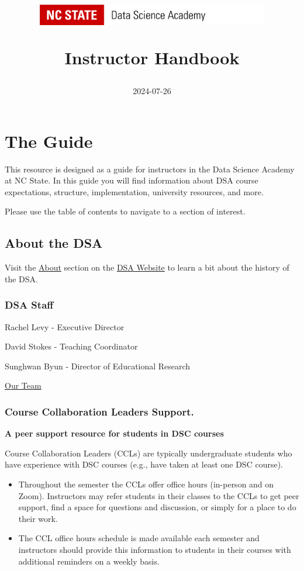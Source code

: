 \documentclass[
]{book}
\title{\includegraphics[width=4in,height=\textheight]{DSA Logo.png}

Instructor Handbook}
\author{2024-07-26}
\date{}
\providecommand{\tightlist}{%
  \setlength{\itemsep}{0pt}\setlength{\parskip}{0pt}}
\begin{document}
\maketitle

{
\setcounter{tocdepth}{1}
\tableofcontents
}
\chapter{The Guide}\label{the-guide}

This resource is designed as a guide for instructors in the Data Science Academy at NC State. In this guide you will find information about DSA course expectations, structure, implementation, university resources, and more.

Please use the table of contents to navigate to a section of interest.

\section{About the DSA}\label{about-the-dsa}

Visit the \href{https://datascienceacademy.ncsu.edu/about/}{About} section on the \href{https://datascienceacademy.ncsu.edu/}{DSA Website} to learn a bit about the history of the DSA.

\subsection{DSA Staff}\label{dsa-staff}

Rachel Levy - Executive Director

David Stokes - Teaching Coordinator

Sunghwan Byun - Director of Educational Research

\href{https://datascienceacademy.ncsu.edu/about/our-team/}{Our Team}

\subsection{Course Collaboration Leaders Support.}\label{course-collaboration-leaders-support.}

\textbf{A peer support resource for students in DSC courses}

Course Collaboration Leaders (CCLs) are typically undergraduate students who have experience with DSC courses (e.g., have taken at least one DSC course).

\begin{itemize}
\tightlist
\item
  Throughout the semester the CCLs offer office hours (in-person and on Zoom). Instructors may refer students in their classes to the CCLs to get peer support, find a space for questions and discussion, or simply for a place to do their work.
\item
  The CCL office hours schedule is made available each semester and instructors should provide this information to students in their courses with additional reminders on a weekly basis.
\end{itemize}
\end{document}
